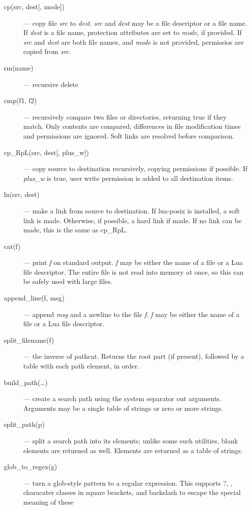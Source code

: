 \begin{description}
\item[cp(src, dest{[}, mode{]})] --- copy file \emph{src} to \emph{dest}.
\emph{src} and \emph{dest} may be a file descriptor or a file name.  If
\emph{dest} is a file name, protection attributes are set to \emph{mode},
if provided.  If \emph{src} and \emph{dest} are both file names, and
\emph{mode} is not provided, permissios are copied from \emph{src}.
\item[rm(name)] --- recursive delete
\item[cmp(f1, f2)] --- recursively compare two files or directories,
returning true if they match.  Only contents are compared; differences
in file modification times and permissions are ignored.  Soft links are
resolved before comparison.
\item[cp\_RpL(src, dest{[}, plus\_w{]})] --- copy source to destination
recursively, copying permissions if possible.  If \emph{plus\_w} is
true, user write permission is added to all destination items.
\item[ln(src, dest)] --- make a link from source to destination.  If
lua-posix is installed, a soft link is made.  Otherwise, if possible,
a hard link if made.  If no link can be made, this is the same as
{\ex cp\_RpL}.
\item[cat(f)] --- print \emph{f} on standard output.  \emph{f} may be
either the name of a file or a Lua file descriptor.  The entire file
is not read into memory at once, so this can be safely used with large
files.
\item[append\_line(f, msg)] --- append \emph{msg} and a newline to the
file \emph{f}.  \emph{f} may be either the name of a file or a Lua
file descriptor.
\item[split\_filename(f)] --- the inverse of {\ex pathcat}.  Returns
the root part (if present), followed by a table with each path
element, in order.
\item[build\_path({\ldots})] --- create a search path using the system
separator out arguments.  Arguments may be a single table
of strings or zero or more strings.
\item[split\_path(p)] --- split a search path into its elements;
unlike some such utilities, blank elements are returned as well.
Elements are returned as a table of strings.
\item[glob\_to\_regex(g)] --- turn a glob-style pattern to a regular
expression.  This supports {\ex ?}, {\ex *}, characater classes in
square brackets, and backslash to escape the special meaning of these

\end{description}
